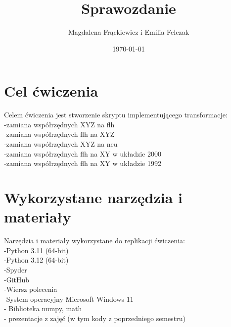 \documentclass[11pt,a4paper]{article}
\title{Sprawozdanie}
\author{Magdalena Frąckiewicz i Emilia Felczak}
\date{\today}
\begin{document}
\maketitle 
\tableofcontents 
\newpage
\section {Cel ćwiczenia}
Celem ćwiczenia jest stworzenie skryptu implementującego transformacje:\\
-zamiana współrzędnych XYZ na flh\\
-zamiana współrzędnych flh na XYZ\\
-zamiana współrzędnych XYZ na neu\\
-zamiana współrzędnych flh na XY w układzie 2000\\
-zamiana współrzędnych flh na XY w układzie 1992\\

\section {Wykorzystane narzędzia i materiały}
Narzędzia i materiały wykorzystane do replikacji ćwiczenia:\\
-Python 3.11  (64-bit)\\                                                       
-Python 3.12 (64-bit)  \\                                                                 
-Spyder  \\                                                                              
-GitHub  \\                                                                             
-Wiersz polecenia\\
-System operacyjny  Microsoft Windows 11\\
- Biblioteka numpy, math\\
- prezentacje z zajęć (w tym kody z poprzedniego semestru)\\
\end{document}
